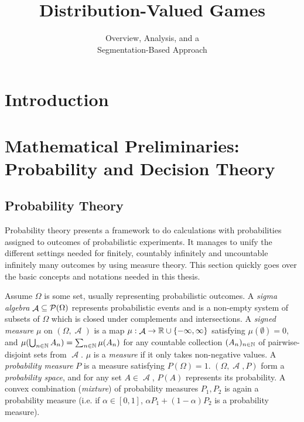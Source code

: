 \documentclass[a4paper]{scrreprt}
\title{\huge Distribution-Valued Games}
\subtitle{\LARGE Overview, Analysis, and a \\Segmentation-Based Approach}
\DeclareMathOperator{\A}{\mathcal{A}}
\begin{document}
    \maketitle
    \tableofcontents
    
    \chapter{Introduction}
    
    \chapter{Mathematical Preliminaries: Probability and Decision Theory}
    
    \section{Probability Theory}
    Probability theory presents a framework to do calculations with probabilities assigned to outcomes of probabilistic experiments. It manages to unify the different settings needed for finitely, countably infinitely and uncountable infinitely many outcomes by using measure theory. This section quickly goes over the basic concepts and notations needed in this thesis.
    
    Assume $\Omega$ is some set, usually representing probabilistic outcomes. 
    A \emph{sigma algebra} $\A \subseteq \Pot(\Omega)$ represents probabilistic events and is a non-empty system of subsets of $\Omega$ which is closed under complements and intersections.
    A \emph{signed measure} $\mu$ on $(\Omega, \A)$ is a map $\mu: \A \to \R \cup \set{-\infty, \infty}$ satisfying $\mu(\emptyset) = 0$, and $\mu(\bigcup_{n \in \mathbb{N}} A_n) = \sum_{n \in \mathbb{N}}\mu(A_n)$ for any countable collection $(A_n)_{n \in \mathbb{N}}$ of pairwise-disjoint sets from $\A$.
    $\mu$ is a \emph{measure} if it only takes non-negative values.
    A \emph{probability measure} $P$ is a measure satisfying $P(\Omega) = 1$.
    $(\Omega, \A, P)$ form a \emph{probability space}, and for any set $A \in \A$, $P(A)$ represents its probability.
    A convex combination (\emph{mixture}) of probability measures $P_1, P_2$ is again a probability measure (i.e. if $\alpha \in [0, 1]$, $\alpha P_1 + (1-\alpha) P_2$ is a probability measure).
    
\end{document}
